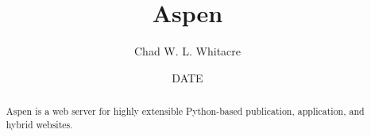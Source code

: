 \documentclass{manual}
\title{Aspen}
\author{Chad W. L. Whitacre}
\date{~~DATE~~} %
\begin{document}
\maketitle

\begin{abstract}

\noindent
Aspen is a web server for highly extensible Python-based publication,
application, and hybrid websites.

\end{abstract}












\end{document}
